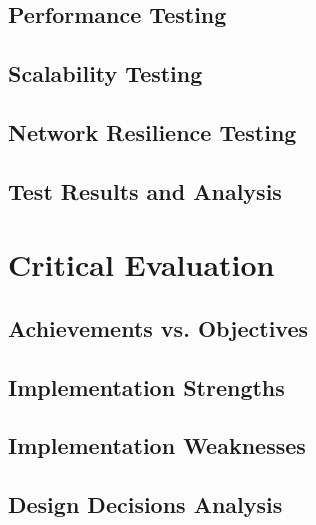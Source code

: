 \documentclass[12pt,a4paper]{report}
\begin{document}
\section{Performance Testing}

\section{Scalability Testing}

\section{Network Resilience Testing}

\section{Test Results and Analysis}

\chapter{Critical Evaluation}
\section{Achievements vs. Objectives}

\section{Implementation Strengths}

\section{Implementation Weaknesses}

\section{Design Decisions Analysis}
\end{document}
